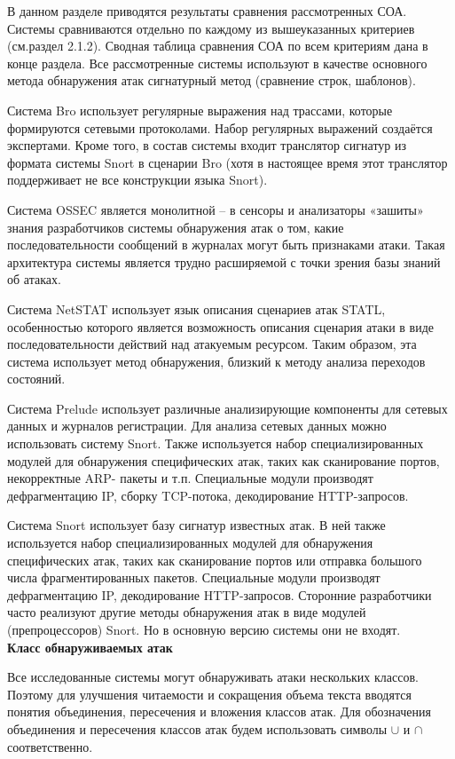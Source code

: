 В данном разделе приводятся результаты сравнения рассмотренных СОА. Системы
сравниваются отдельно по каждому из вышеуказанных критериев (см.раздел 2.1.2).
Сводная таблица сравнения СОА по всем критериям дана в конце раздела.
Все рассмотренные системы используют в качестве основного метода обнаружения
атак сигнатурный метод (сравнение строк, шаблонов).

Система Bro использует регулярные выражения над трассами, которые
формируются сетевыми протоколами. Набор регулярных выражений создаётся
экспертами. Кроме того, в состав системы входит транслятор сигнатур из формата
системы Snort в сценарии Bro (хотя в настоящее время этот транслятор поддерживает
не все конструкции языка Snort).

Система OSSEC является монолитной – в сенсоры и анализаторы «зашиты» знания
разработчиков системы обнаружения атак о том, какие последовательности сообщений
в журналах могут быть признаками атаки. Такая архитектура системы является трудно
расширяемой с точки зрения базы знаний об атаках.

Система NetSTAT использует язык описания сценариев атак STATL, особенностью
которого является возможность описания сценария атаки в виде последовательности
действий над атакуемым ресурсом. Таким образом, эта система использует метод
обнаружения, близкий к методу анализа переходов состояний.

Система Prelude использует различные анализирующие компоненты для сетевых
данных и журналов регистрации. Для анализа сетевых данных можно использовать
систему Snort. Также используется набор специализированных модулей для
обнаружения специфических атак, таких как сканирование портов, некорректные ARP-
пакеты и т.п. Специальные модули производят дефрагментацию IP, сборку TCP-потока,
декодирование HTTP-запросов.

Система Snort использует базу сигнатур известных атак. В ней также используется
набор специализированных модулей для обнаружения специфических атак, таких как
сканирование портов или отправка большого числа фрагментированных пакетов.
Специальные модули производят дефрагментацию IP, декодирование HTTP-запросов.
Сторонние разработчики часто реализуют другие методы обнаружения атак в виде
модулей (препроцессоров) Snort. Но в основную версию системы они не входят.\\

\textbf{Класс обнаруживаемых атак}

Все исследованные системы могут обнаруживать атаки нескольких классов.
Поэтому для улучшения читаемости и сокращения объема текста вводятся понятия
объединения, пересечения и вложения классов атак. Для обозначения объединения и
пересечения классов атак будем использовать символы $\cup$ и $\cap$ соответственно.


